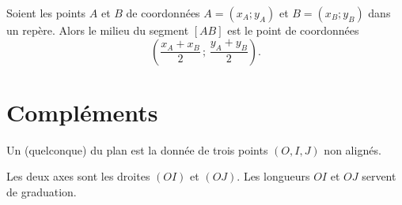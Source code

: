 \begin{Aretenir}
    Soient les points \( A\) et \( B\) de coordonnées \( A=(x_A;y_A)\) et \( B=(x_B;y_B)\) dans un repère. Alors le milieu du segment \( [AB]\) est le point de coordonnées
    \begin{equation*}
            \left( \frac{ x_A+x_B }{ 2 }\,;\,\frac{ y_A+y_B }{2} \right).
    \end{equation*}
\end{Aretenir}


\section{Compléments}

\begin{definition}
    Un  (quelconque) du plan est la donnée de trois points \( (O,I,J)\) non alignés.

    Les deux axes sont les droites \( (OI)\) et \( (OJ)\). Les longueurs \( OI\) et \( OJ\) servent de graduation.
\end{definition}

